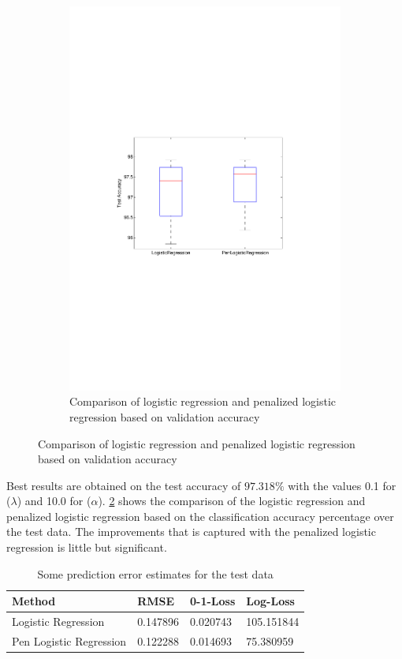 {\begin{figure}[h]
\begin{subfigure}[b]{0.45\textwidth}
    \includegraphics[clip, trim=4cm 10cm 3cm 10cm, width=\textwidth]{figures/comparison_LR_pLR.pdf}
    \caption{Comparison of logistic regression and penalized logistic regression based on validation accuracy}
    \label{fig:comp_LR_pLR}
  \end{subfigure}
\end{figure}

Best results are obtained on the test accuracy of $97.318\%$ with the values 0.1 for ($\lambda$) and 10.0 for ($\alpha$).
\ref{fig:comp_LR_pLR} shows the comparison of the logistic regression and penalized logistic regression based on the classification accuracy percentage over the test data. The improvements that is captured with the penalized logistic regression is little but significant.  

\begin{table}[h!]
\begin{center}
    \begin{tabular}{ | l | l | l | p{5cm} |}
    \hline
    Method & RMSE & 0-1-Loss & Log-Loss \\ \hline
    Logistic Regression & 0.147896 & 0.020743 & 105.151844 \\ \hline
    Pen Logistic Regression & 0.122288 & 0.014693 & 75.380959 \\ \hline
    \end{tabular}
\end{center}
\caption{Some prediction error estimates for the test data}
\label{table:test_errors}
\end{table}
 
}
